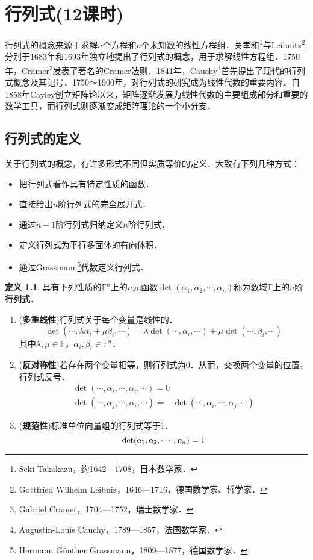 \documentclass[a4paper,fontset=windows]{ctexbook}
\theoremstyle{definition}
\newtheorem{definition}{定义}[chapter]
\begin{document}
\chapter{行列式(12课时)}%

行列式的概念来源于求解$n$个方程和$n$个未知数的线性方程组．关孝和\footnote{Seki Takakazu，约1642—1708，日本数学家．}与Leibnitz\footnote{Gottfried Wilhelm Leibniz，1646—1716，德国数学家、哲学家．}分别于1683年和1693年独立地提出了行列式的概念，用于求解线性方程组．1750年，Cramer\footnote{Gabriel Cramer，1704—1752，瑞士数学家．}发表了著名的Cramer法则．1841年，Cauchy\footnote{Augustin-Louis Cauchy，1789—1857，法国数学家．}首先提出了现代的行列式概念及其记号．1750～1900年，对行列式的研究成为线性代数的重要内容．自1858年Cayley创立矩阵论以来，矩阵逐渐发展为线性代数的主要组成部分和重要的数学工具，而行列式则逐渐变成矩阵理论的一个小分支．

\section{行列式的定义}

关于行列式的概念，有许多形式不同但实质等价的定义．大致有下列几种方式：
\begin{itemize}
\item 把行列式看作具有特定性质的函数．
\item 直接给出$n$阶行列式的完全展开式．
\item 通过$n-1$阶行列式归纳定义$n$阶行列式．
\item 定义行列式为平行多面体的有向体积．
\item 通过Grassmann\footnote{Hermann G\"unther Grassmann，1809—1877，德国数学家．}代数定义行列式．
\end{itemize}

\begin{definition}\label{def3.1}
具有下列性质的$\mathbb{F}^n$上的$n$元函数$\det(\alpha_1,\alpha_2,\cdots,\alpha_n)$称为数域$\mathbb{F}$上的$n$阶{\bf 行列式}．
\begin{enumerate}
\item({\bf 多重线性})行列式关于每个变量是线性的．
$$\det(\cdots,\lambda\alpha_i+\mu\beta_i,\cdots)=\lambda\det(\cdots,\alpha_i,\cdots)+\mu\det(\cdots,\beta_i,\cdots)$$
其中$\lambda,\mu\in\mathbb{F}$，$\alpha_i,\beta_i\in\mathbb{F}^n$．

\item({\bf 反对称性})若存在两个变量相等，则行列式为0．从而，交换两个变量的位置，行列式反号．
$$\begin{array}{c}
\det(\cdots,\alpha_i,\cdots,\alpha_i,\cdots)=0 \\
\det(\cdots,\alpha_j,\cdots,\alpha_i,\cdots)=-\det(\cdots,\alpha_i,\cdots,\alpha_j,\cdots)\end{array}$$

\item({\bf 规范性})标准单位向量组的行列式等于1．
$$\det({\bf e}_1,{\bf e}_2,\cdots,{\bf e}_n)=1$$
\end{enumerate}
\end{definition}
\end{document}
